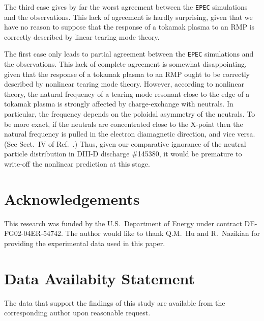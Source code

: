 \documentclass[12pt,prb,aps]{revtex4-1}
\begin{document}
 The third case gives by far the worst agreement between the {\tt EPEC} simulations and the  observations. This lack of agreement is hardly surprising, given
that we have no reason to suppose that the response of a tokamak plasma to an RMP is correctly described by linear tearing mode theory.\cite{rf1} 

The first case only leads to partial agreement between  the {\tt EPEC} simulations and the  observations. This lack of complete agreement is somewhat
disappointing, given that the response of a tokamak plasma to an RMP ought to be correctly described by nonlinear tearing mode theory. However, according to
nonlinear theory, the natural frequency of a tearing mode resonant close to the edge of a tokamak plasma is strongly affected by charge-exchange with neutrals.\cite{rf2}
In particular, the frequency depends on the poloidal asymmetry of the neutrals. To be more exact, if the neutrals are concentrated close to the X-point then the
natural frequency is pulled in the electron diamagnetic direction, and vice versa.\cite{rf2} (See Sect.~IV of Ref.~.) Thus, given our comparative ignorance of the neutral particle
distribution in DIII-D discharge \#145380, it would be premature to write-off the nonlinear prediction at this stage.  

\section*{Acknowledgements}
This research was funded by the U.S.\ Department of Energy under contract DE-FG02-04ER-54742.
The author would like to thank Q.M.~Hu and R.~Nazikian for providing the experimental data used in this paper. 
 
\section*{Data Availabity Statement}
The data that support the findings of this study are available from the corresponding author upon reasonable request.
 
 
\end{document}
